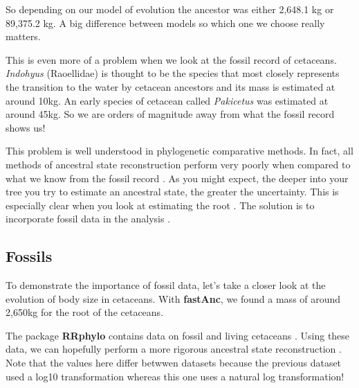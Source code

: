 \documentclass[
]{book}
\newenvironment{Shaded}{\begin{snugshade}}{\end{snugshade}}
\newcommand{\KeywordTok}[1]{\textcolor[rgb]{0.13,0.29,0.53}{\textbf{#1}}}
\newcommand{\NormalTok}[1]{#1}
\newcommand{\OperatorTok}[1]{\textcolor[rgb]{0.81,0.36,0.00}{\textbf{#1}}}
\newcommand{\StringTok}[1]{\textcolor[rgb]{0.31,0.60,0.02}{#1}}
\begin{document}
So depending on our model of evolution the ancestor was either 2,648.1 kg or 89,375.2 kg. A big difference between models so which one we choose really matters.

This is even more of a problem when we look at the fossil record of cetaceans. \emph{Indohyus} (Raoellidae) is thought to be the species that most closely represents the transition to the water by cetacean ancestors \citep{Thewissen09} and its mass is estimated at around 10kg. An early species of cetacean called \emph{Pakicetus} was estimated at around 45kg. So we are orders of magnitude away from what the fossil record shows us!

This problem is well understood in phylogenetic comparative methods. In fact, all methods of ancestral state reconstruction perform very poorly when compared to what we know from the fossil record \citep{Webster02}. As you might expect, the deeper into your tree you try to estimate an ancestral state, the greater the uncertainty. This is especially clear when you look at estimating the root \citep{Gascuel14}. The solution is to incorporate fossil data in the analysis \citep{Slater12}.

\hypertarget{fossils}{%
\subsection{Fossils}\label{fossils}}

To demonstrate the importance of fossil data, let's take a closer look at the evolution of body size in cetaceans. With \textbf{fastAnc}, we found a mass of around 2,650kg for the root of the cetaceans.

The package \textbf{RRphylo} \citep{rrphylo} contains data on fossil and living cetaceans \citep{Serio19}. Using these data, we can hopefully perform a more rigorous ancestral state reconstruction \citep{Castiglione20}. Note that the values here differ betwwen datasets because the previous dataset used a log10 transformation whereas this one uses a natural log transformation!

\begin{Shaded}
\end{Shaded}
\end{document}
